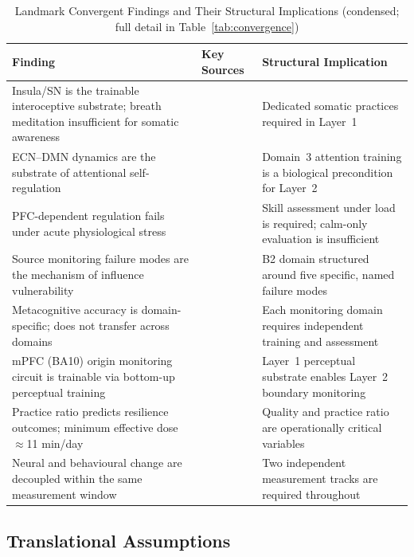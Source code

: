 \documentclass[12pt, a4paper]{article}
\begin{document}
\begin{table}[htbp]
\centering
\caption{Landmark Convergent Findings and Their Structural Implications
         (condensed; full detail in Table~\ref{tab:convergence})}
\label{tab:convergence_condensed}
\small
\begin{tabular}{p{4.5cm}p{2.8cm}p{5.2cm}}
\toprule
\textbf{Finding} & \textbf{Key Sources} & \textbf{Structural Implication} \\
\midrule
Insula/SN is the trainable interoceptive substrate; breath meditation insufficient for somatic awareness &
  \citet{calderone2024, yue2023} &
  Dedicated somatic practices required in Layer~1 \\[4pt]
ECN--DMN dynamics are the substrate of attentional self-regulation &
  \citet{ganesan2025, yue2023} &
  Domain~3 attention training is a biological precondition for Layer~2 \\[4pt]
PFC-dependent regulation fails under acute physiological stress &
  \citet{raio2013} &
  Skill assessment under load is required; calm-only evaluation is insufficient \\[4pt]
Source monitoring failure modes are the mechanism of influence vulnerability &
  \citet{johnson1993, mitchell2009, simons2008} &
  B2 domain structured around five specific, named failure modes \\[4pt]
Metacognitive accuracy is domain-specific; does not transfer across domains &
  \citet{morales2018, fleming2014} &
  Each monitoring domain requires independent training and assessment \\[4pt]
mPFC (BA10) origin monitoring circuit is trainable via bottom-up perceptual training &
  \citet{subramaniam2012} &
  Layer~1 perceptual substrate enables Layer~2 boundary monitoring \\[4pt]
Practice ratio predicts resilience outcomes; minimum effective dose $\approx$11 min/day &
  \citet{jha2015, jha2016, jha2017, jha2020} &
  Quality and practice ratio are operationally critical variables \\[4pt]
Neural and behavioural change are decoupled within the same measurement window &
  \citet{yue2023} &
  Two independent measurement tracks are required throughout \\
\bottomrule
\end{tabular}
\end{table}

\subsection{Translational Assumptions}
\end{document}
